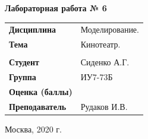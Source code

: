 \documentclass[a4paper,14pt]{extreport} %
\begin{document}
\begin{titlepage}
    \vspace{2cm}

    \begin{center}
        \textbf{Лабораторная работа № 6} \\
        \vspace{0.5cm}
    \end{center}

    \vspace{4cm}

    \begin{flushleft}
        \begin{tabular}{ll}
            \textbf{Дисциплина} & Моделирование.  \\
            \textbf{Тема} & Кинотеатр.  \\
            \\
            \textbf{Студент} & Сиденко А.Г. \\
            \textbf{Группа} & ИУ7-73Б \\
            \textbf{Оценка (баллы)} & \\
            \textbf{Преподаватель} & Рудаков И.В.   \\
        \end{tabular}
    \end{flushleft}

    \vspace{4cm}

   \begin{center}
        Москва, 2020 г.
    \end{center}

\end{titlepage}
\end{document}
